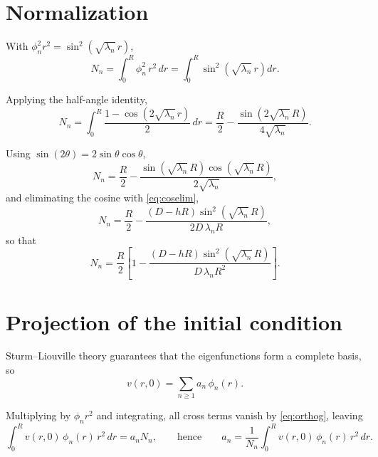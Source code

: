 \documentclass[11pt,a4paper]{article}
\begin{document}
\section{Normalization}

With $\phi_{n}^{2} r^{2} = \sin^{2}\!\left(\sqrt{\lambda_{n}}\,r\right)$,
\begin{equation}
N_{n} = \int_{0}^{R} \phi_{n}^{2}\, r^{2}\,dr
= \int_{0}^{R} \sin^{2}\!\left(\sqrt{\lambda_{n}}\,r\right) dr .
\end{equation}

Applying the half-angle identity,
\begin{equation}
N_{n}
= \int_{0}^{R} \frac{1 - \cos\!\left(2\sqrt{\lambda_{n}}\,r\right)}{2}\,dr
= \frac{R}{2} - \frac{\sin\!\left(2\sqrt{\lambda_{n}}\,R\right)}{4\sqrt{\lambda_{n}}} .
\end{equation}

Using $\sin(2\theta) = 2\sin\theta\cos\theta$,
\begin{equation}
N_{n} = \frac{R}{2}
- \frac{\sin\!\left(\sqrt{\lambda_{n}}\,R\right)
\cos\!\left(\sqrt{\lambda_{n}}\,R\right)}{2\sqrt{\lambda_{n}}} ,
\end{equation}
and eliminating the cosine with \eqref{eq:coselim},
\begin{equation}
N_{n} = \frac{R}{2}
- \frac{\left(D - hR\right)\sin^{2}\!\left(\sqrt{\lambda_{n}}\,R\right)}
{2D\,\lambda_{n} R} ,
\end{equation}
so that
\begin{equation}
\boxed{\;
N_{n} = \frac{R}{2}\left[1
- \frac{\left(D - hR\right)\sin^{2}\!\left(\sqrt{\lambda_{n}}\,R\right)}
{D\,\lambda_{n} R^{2}}\right] .
\;}
\label{eq:norm}
\end{equation}

\section{Projection of the initial condition}

Sturm--Liouville theory guarantees that the eigenfunctions form a complete basis, so
\begin{equation}
v(r,0) = \sum_{n \ge 1} a_{n}\,\phi_{n}(r) .
\end{equation}

Multiplying by $\phi_{n} r^{2}$ and integrating, all cross terms vanish by
\eqref{eq:orthog}, leaving
\begin{equation}
\int_{0}^{R} v(r,0)\,\phi_{n}(r)\, r^{2}\,dr = a_{n} N_{n} ,
\qquad\text{hence}\qquad
a_{n} = \frac{1}{N_{n}}\int_{0}^{R} v(r,0)\,\phi_{n}(r)\, r^{2}\,dr .
\end{equation}
\end{document}
